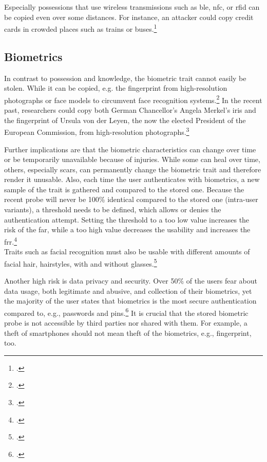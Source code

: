 Especially possessions that use wireless transmissions such as \gls{ble}, \gls{nfc}, or \gls{rfid} can be copied even over some distances. For instance, an attacker could copy credit cards in crowded places such as trains or buses.\footcite{6892730}

\subsection{Biometrics}

In contrast to possession and knowledge, the biometric trait cannot easily be stolen. While it can be copied, e.g. the fingerprint from high-resolution photographs or 
face models to circumvent face recognition systems.\footcites[][]{185181}[][]{220566} In the recent past, researchers could copy both German Chancellor's Angela Merkel's iris and the fingerprint of Ursula von der Leyen, the now the elected President of the European Commission, from high-resolution photographs.\footcite{ccc-merkel}

Further implications are that the biometric characteristics can change over time or be temporarily unavailable because of injuries. While some can heal over time, others, especially scars, can permanently change the biometric trait and therefore render it unusable. Also, each time the user authenticates with biometrics, a new sample of the trait is gathered and compared to the stored one. Because the recent probe will never be 100\% identical compared to the stored one (\frqq intra-user variants\flqq), a threshold needs to be defined, which allows or denies the authentication attempt. Setting the threshold to a too low value increases the risk of the \gls{far}, while a too high value decreases the usability and increases the \gls{frr}.\footcite[See][13--17, 52]{Jain2011}\\Traits such as facial recognition must also be usable with different amounts of facial hair, hairstyles, with and without glasses.\footcite[See][98]{Jain2011}

Another high risk is data privacy and security. Over 50\% of the users fear about data usage, both legitimate and abusive, and collection of their biometrics, yet the majority of the user states that biometrics is the most secure authentication compared to, e.g., passwords and \glspl{pin}.\footcite[See][8]{ibm-security} It is crucial that the stored biometric probe is not accessible by third parties nor shared with them. For example, a theft of smartphones should not mean theft of the biometrics, e.g., fingerprint, too.

